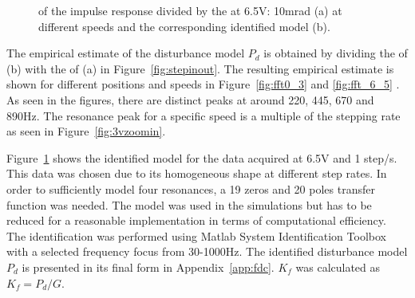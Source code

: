 \begin{figure}[h!]
  \centering %
  \qquad
  \caption{\label{fig:fft_6_5_modelfit} \abbrFFT of the impulse response divided by the \abbrFFT at 6.5V: 10mrad (a) at different speeds and the corresponding identified model (b).}
\end{figure}

The empirical estimate of the disturbance model $P_d$ is obtained by dividing the \abbrFFT of (b) with the \abbrFFT of (a) in Figure~\ref{fig:stepinout}. The resulting empirical estimate is shown for different positions and speeds in Figure~\ref{fig:fft0_3} and \ref{fig:fft_6_5} . As seen in the figures, there are distinct peaks at around 220, 445, 670 and 890Hz. The resonance peak for a specific speed is a multiple of the stepping rate as seen in Figure~\ref{fig:3vzoomin}.

Figure~\ref{fig:fft_6_5_modelfit} shows the identified model for the data acquired at 6.5V and 1 step/s. This data was chosen due to its homogeneous shape at different step rates. In order to sufficiently model four resonances, a 19 zeros and 20 poles transfer function was needed. The model was used in the simulations but has to be reduced for a reasonable implementation in terms of computational efficiency. The identification was performed using Matlab System Identification Toolbox with a selected frequency focus from 30-1000Hz. The identified disturbance model $P_d$ is presented in its final form in Appendix~\ref{app:fdc}. $K_f$ was calculated as $K_f=P_d/G$.

